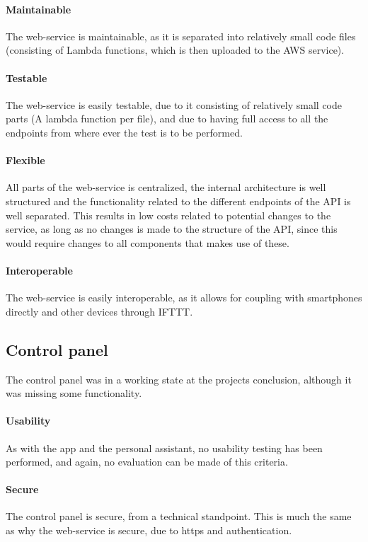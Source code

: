 \paragraph{Maintainable}
The web-service is maintainable, as it is separated into relatively small code files (consisting of Lambda functions, which is then uploaded to the AWS service).

\paragraph{Testable}
The web-service is easily testable, due to it consisting of relatively small code parts (A lambda function per file), and due to having full access to all the endpoints from where ever the test is to be performed.

\paragraph{Flexible}
All parts of the web-service is centralized, the internal architecture is well structured and the functionality related to the different endpoints of the API is well separated. This results in low costs related to potential changes to the service, as long as no changes is made to the structure of the API, since this would require changes to all components that makes use of these.

\paragraph{Interoperable}
The web-service is easily interoperable, as it allows for coupling with smartphones directly and other devices through IFTTT.

\subsection{Control panel}
The control panel was in a working state at the projects conclusion, although it was missing some functionality. 
\paragraph{Usability}
As with the app and the personal assistant, no usability testing has been performed, and again, no evaluation can be made of this criteria.

\paragraph{Secure}
The control panel is secure, from a technical standpoint. This is much the same as why the web-service is secure, due to https and authentication.

